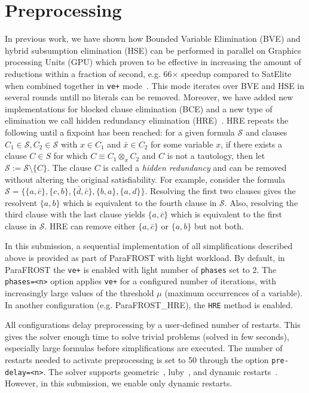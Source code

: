 \documentclass[conference]{IEEEtran}
\newcommand{\parafrost}{ParaFROST\xspace}
\newcommand{\parafrostHRE}{ParaFROST\_HRE\xspace}
\begin{document}
\section{Preprocessing}
In previous work, we have shown how Bounded Variable Elimination (BVE) and hybrid subsumption elimination (HSE) can be performed in parallel on Graphics processing Units (GPU) which proven to be effective in increasing the amount of reductions within a fraction of second, e.g. 66$\times$ speedup compared to SatElite when combined together in \texttt{ve+} mode~\cite{sigmaTacas}. This mode iterates over BVE and HSE in several rounds untill no literals can be removed. Moreover, we
have added new implementations for blocked clause elimination (BCE) and a new type
of elimination we call hidden redundancy elimination (HRE)~\cite{sigmaIfm}. HRE repeats the following until a fixpoint has been reached: for a given formula $\mathcal{S}$ and clauses $C_1\in\mathcal{S},C_2\in\mathcal{S}$ with $x\in C_1$ and $\bar{x}\in C_2$ for some variable $x$, if there exists a clause $C\in S$ for which $C\equiv C_1 \otimes_{x} C_2$ and $C$ is not a tautology, then let $\mathcal{S} := \mathcal{S} \setminus \{C\}$. The clause $C$ is called a \emph{hidden redundancy} and can be removed without altering the original satisfiability.
For example, consider the formula $\mathcal{S}=\{\{a,\bar{c}\},\{c,b\},\{\bar{d},\bar{c}\},\{b, a\},\{a,d\}\}$.
Resolving the first two clauses gives the resolvent $\{a,b\}$ which is equivalent to the fourth clause in $\mathcal{S}$. Also, resolving the third clause with the last clause yields $\{a,\bar{c}\}$ which is equivalent to the first clause in $\mathcal{S}$. HRE can remove either $\{a,\bar{c}\}$ or $\{a,b\}$ but not both.

In this submission, a sequential implementation of all simplifications described above is provided as part of \parafrost with light workload. By default, in \parafrost the \texttt{ve+} is enabled with light number of \texttt{phases} set to 2. The \texttt{phases=<n>} option applies \texttt{ve+} for a configured number of iterations, with increasingly large values of the threshold $\mu$ (maximum occurrences of a variable). In another configuration (e.g. \parafrostHRE), the \texttt{HRE} method is enabled.

All configurations delay preprocessing by a user-defined number of restarts. This gives the solver enough time to solve trivial problems (solved in few seconds), especially large formulas before simplifications are executed. The number of restarts needed to activate preprocessing is set to 50 through the option \texttt{pre-delay=<n>}. The solver supports geometric~\cite{geoRestart}, luby~\cite{minisat}, and dynamic restarts~\cite{dynamicRestarts}. However, in this submission, we enable only dynamic restarts.


\end{document}
